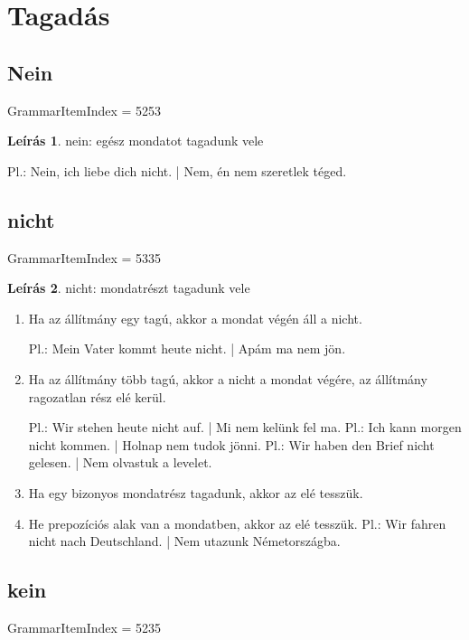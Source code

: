 \documentclass{article}
\theoremstyle{definition}
\newtheorem*{desc}{Leírás}
\begin{document}
\section{Tagadás}

\subsection{Nein}

GrammarItemIndex = 5253

\begin{desc}
nein: egész mondatot tagadunk vele

Pl.: Nein, ich liebe dich nicht. | Nem, én nem szeretlek téged.
\end{desc}

\subsection{nicht}

GrammarItemIndex = 5335

\begin{desc}
nicht: mondatrészt tagadunk vele

\begin{enumerate}
\item Ha az állítmány egy tagú, akkor a mondat végén áll a nicht.

Pl.: Mein Vater kommt heute nicht. | Apám ma nem jön.

\item Ha az állítmány több tagú, akkor a nicht a mondat végére, az állítmány ragozatlan rész elé kerül.

Pl.: Wir stehen heute nicht auf. | Mi nem kelünk fel ma.
Pl.: Ich kann morgen nicht kommen. | Holnap nem tudok jönni.
Pl.: Wir haben den Brief nicht gelesen. | Nem olvastuk a levelet.

\item Ha egy bizonyos mondatrész tagadunk, akkor az elé tesszük.
\item He prepozíciós alak van a mondatben, akkor az elé tesszük.
Pl.: Wir fahren nicht nach Deutschland. | Nem utazunk Németországba.
\end{enumerate}
\end{desc}

\subsection{kein}

GrammarItemIndex = 5235
\end{document}

